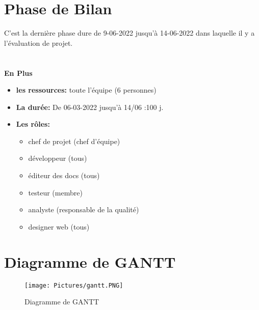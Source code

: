 \documentclass[11pt,fleqn]{book} %
\begin{document}
\section{Phase de Bilan}
C’est la dernière phase dure de 9-06-2022 jusqu’à 14-06-2022 dans laquelle il y a l’évaluation de projet.
\\
\\
\\
\textbf{En Plus}
\begin{itemize}
    \item \textbf{les ressources: } toute l’équipe (6 personnes)
    \item \textbf{La durée: } De 06-03-2022 jusqu'à 14/06 :100 j.
    \item \textbf{Les rôles: }
    \begin{itemize}
        \item  chef de projet (chef d’équipe)
        \item  développeur (tous)
        \item éditeur des docs (tous)
        \item testeur (membre)
        \item analyste (responsable de la qualité)
        \item designer web (tous)
    \end{itemize}
\end{itemize}

\newpage
\section{Diagramme de GANTT}
\begin{figure}[h]
    \centering
    \texttt{[image: Pictures/gantt.PNG]}
    \caption{Diagramme de GANTT}
    \label{fig:pca}
\end{figure}
\end{document}

